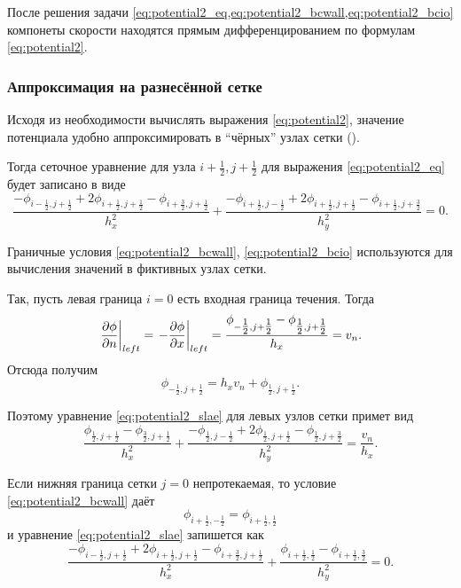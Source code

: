 После решения задачи \cref{eq:potential2_eq,eq:potential2_bcwall,eq:potential2_bcio}
компонеты скорости находятся прямым дифференцированием по формулам \cref{eq:potential2}.

\subsubsection{Аппроксимация на разнесённой сетке}
Исходя из необходимости вычислять выражения \cref{eq:potential2},
значение потенциала удобно аппроксимировать в ``чёрных'' узлах сетки ().

Тогда сеточное уравнение для узла $i+\tfrac12, j+\tfrac12$ для выражения \cref{eq:potential2_eq}
будет записано в виде
\begin{equation}
\label{eq:potential2_slae}
\frac{-\phi_{i-\tfrac12, j+\tfrac12} + 2 \phi_{i+\tfrac12, j+\tfrac12} - \phi_{i+\tfrac32,j+\tfrac12}}{h_x^2}
+
\frac{-\phi_{i+\tfrac12, j-\tfrac12} + 2 \phi_{i+\tfrac12, j+\tfrac12} - \phi_{i+\tfrac12,j+\tfrac32}}{h_y^2}
= 0.
\end{equation}

Граничные условия \cref{eq:potential2_bcwall}, \cref{eq:potential2_bcio}
используются для вычисления значений в фиктивных узлах сетки.

Так, пусть левая граница $i=0$ есть входная граница течения. Тогда
\begin{equation*}
\left. \frac{\partial \phi}{\partial n} \right|_{left} = \left. -\frac{\partial \phi}{\partial x} \right|_{left} = \frac{\phi_{-\tfrac12, j+\tfrac12} - \phi_{\tfrac12, j+\tfrac12}}{h_x} = v_n.
\end{equation*}
Отсюда получим
\begin{equation*}
\phi_{-\tfrac12, j+\tfrac12} = h_x v_n + \phi_{\tfrac12, j+\tfrac12}.
\end{equation*}

Поэтому уравнение \cref{eq:potential2_slae} для левых узлов сетки примет вид
\begin{equation*}
\frac{\phi_{\tfrac12, j+\tfrac12} - \phi_{\tfrac32,j+\tfrac12}}{h_x^2}
+
\frac{-\phi_{\tfrac12, j-\tfrac12} + 2 \phi_{\tfrac12, j+\tfrac12} - \phi_{\tfrac12,j+\tfrac32}}{h_y^2}
= \frac{v_n}{h_x}.
\end{equation*}

Если нижняя граница сетки $j=0$ непротекаемая, то условие \cref{eq:potential2_bcwall} даёт
\begin{equation*}
\phi_{i+\tfrac12, -\tfrac12} = \phi_{i+\tfrac12, \tfrac12}
\end{equation*}
и уравнение \cref{eq:potential2_slae} запишется как
\begin{equation*}
\frac{-\phi_{i-\tfrac12, j+\tfrac12} + 2 \phi_{i+\tfrac12, j+\tfrac12} - \phi_{i+\tfrac32,j+\tfrac12}}{h_x^2}
+
\frac{\phi_{i+\tfrac12, \tfrac12} - \phi_{i+\tfrac12,\tfrac32}}{h_y^2}
= 0.
\end{equation*}

